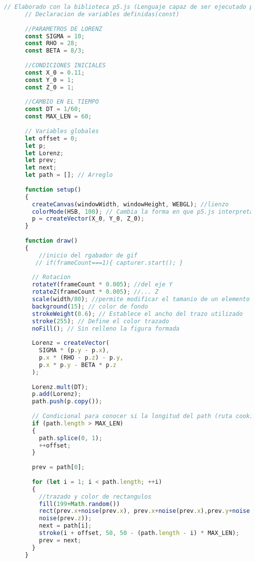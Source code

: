 \documentclass[stu, 12pt, letterpaper, donotrepeattitle, floatsintext]{apa7}
\begin{document}
    \begin{lstlisting}[language=JavaScript]
      // Elaborado con la biblioteca p5.js (Lenguaje capaz de ser ejecutado por navegadores web)
      // Declaracion de variables definidas(const)
      
      //PARAMETROS DE LORENZ
      const SIGMA = 10;
      const RHO = 28;
      const BETA = 8/3;
      
      //CONDICIONES INICIALES
      const X_0 = 0.11;
      const Y_0 = 1;
      const Z_0 = 1;
      
      //CAMBIO EN EL TIEMPO
      const DT = 1/60;
      const MAX_LEN = 60;
      
      // Variables globales
      let offset = 0;
      let p;
      let Lorenz;
      let prev;
      let next;
      let path = []; // Arreglo
      
      function setup() 
      {
        createCanvas(windowWidth, windowHeight, WEBGL); //lienzo
        colorMode(HSB, 100); // Cambia la forma en que p5.js interpreta los datos de color; Hub, Saturation and Brightness
        p = createVector(X_0, Y_0, Z_0);
      }
      
      function draw() 
      {
          //inicio del rgabador de gif
         // if(frameCount===1){ capturer.start(); }
      
        // Rotacion
        rotateY(frameCount * 0.005); //del eje Y
        rotateZ(frameCount * 0.005); //... Z
        scale(width/80); //permite modificar el tamanio de un elemento en el plano 
        background(15); // color de fondo
        strokeWeight(0.6); // Establece el ancho del trazo utilizado
        stroke(255); // Define el color trazado
        noFill(); // Sin relleno la figura formada
      
        Lorenz = createVector(
          SIGMA * (p.y - p.x),
          p.x * (RHO - p.z) - p.y,
          p.x * p.y - BETA * p.z 
        );
      
        Lorenz.mult(DT);
        p.add(Lorenz);
        path.push(p.copy());
      
        // Condicional para conocer si la longitud del path (ruta cookies) es mayor al valor de MAX_LEN ya definido
        if (path.length > MAX_LEN) 
        {
          path.splice(0, 1);
          ++offset;
        }
        
        prev = path[0];
      
        for (let i = 1; i < path.length; ++i)
        {
          //trazado y color de rectangulos
          fill(199+Math.random())
          rect(prev.x+noise(prev.x), prev.x+noise(prev.x),prev.y+noise(prev.y), prev.z*
          noise(prev.z));
          next = path[i];
          stroke(i + offset, 50, 50 - (path.length - i) * MAX_LEN); 
          prev = next;
        }
      }
      \end{lstlisting}
\end{document}
